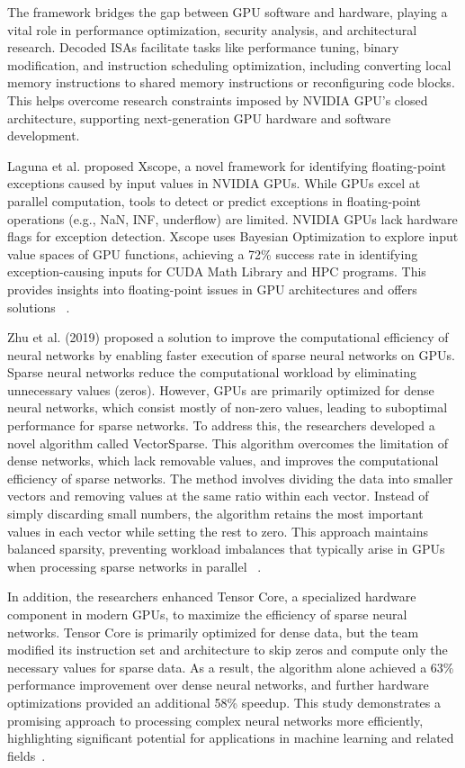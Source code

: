 \documentclass[conference]{IEEEtran}
\begin{document}
The framework bridges the gap between GPU software and hardware, playing a vital role in performance optimization, security analysis, and architectural research. Decoded ISAs facilitate tasks like performance tuning, binary modification, and instruction scheduling optimization, including converting local memory instructions to shared memory instructions or reconfiguring code blocks. This helps overcome research constraints imposed by NVIDIA GPU's closed architecture, supporting next-generation GPU hardware and software development.

Laguna et al. proposed Xscope, a novel framework for identifying floating-point exceptions caused by input values in NVIDIA GPUs. While GPUs excel at parallel computation, tools to detect or predict exceptions in floating-point operations (e.g., NaN, INF, underflow) are limited. NVIDIA GPUs lack hardware flags for exception detection. Xscope uses Bayesian Optimization to explore input value spaces of GPU functions, achieving a 72\% success rate in identifying exception-causing inputs for CUDA Math Library and HPC programs. This provides insights into floating-point issues in GPU architectures and offers solutions ~\cite{Laguna2022}.

Zhu et al. (2019) proposed a solution to improve the computational efficiency of neural networks by enabling faster execution of sparse neural networks on GPUs. Sparse neural networks reduce the computational workload by eliminating unnecessary values (zeros). However, GPUs are primarily optimized for dense neural networks, which consist mostly of non-zero values, leading to suboptimal performance for sparse networks. To address this, the researchers developed a novel algorithm called VectorSparse. This algorithm overcomes the limitation of dense networks, which lack removable values, and improves the computational efficiency of sparse networks. The method involves dividing the data into smaller vectors and removing values at the same ratio within each vector. Instead of simply discarding small numbers, the algorithm retains the most important values in each vector while setting the rest to zero. This approach maintains balanced sparsity, preventing workload imbalances that typically arise in GPUs when processing sparse networks in parallel ~\cite{Zhu2019}.

In addition, the researchers enhanced Tensor Core, a specialized hardware component in modern GPUs, to maximize the efficiency of sparse neural networks. Tensor Core is primarily optimized for dense data, but the team modified its instruction set and architecture to skip zeros and compute only the necessary values for sparse data. As a result, the algorithm alone achieved a 63\% performance improvement over dense neural networks, and further hardware optimizations provided an additional 58\% speedup. This study demonstrates a promising approach to processing complex neural networks more efficiently, highlighting significant potential for applications in machine learning and related fields~\cite{Zhu2019}.
\end{document}
